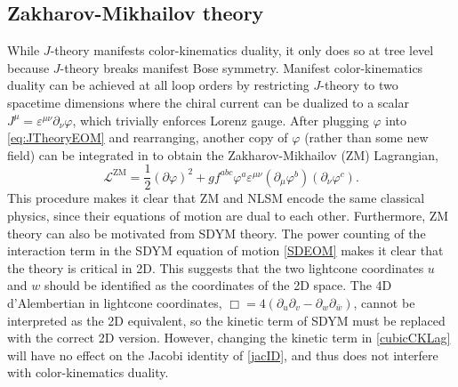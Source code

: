\documentclass[11pt,letter]{article}
\begin{document}
\subsection{Zakharov-Mikhailov theory}
\label{sec:ZMTheory}
While $J$-theory manifests color-kinematics duality, it only does so at
tree level because $J$-theory breaks manifest Bose symmetry.  Manifest
color-kinematics duality can be achieved at all loop orders by
restricting $J$-theory to two spacetime dimensions where the chiral
current can be dualized to a scalar
$J^\mu = \varepsilon^{\mu\nu} \partial_\nu \varphi$, which trivially
enforces Lorenz gauge.  After plugging $\varphi$ into
\cref{eq:JTheoryEOM} and rearranging, another copy of $\varphi$
(rather than some new field) can be integrated in to obtain the
Zakharov-Mikhailov (ZM) Lagrangian,
\begin{equation}
\label{eq:ZMLagrangian}
\mathcal{L}^{\text{ZM}} = \frac{1}{2}(\partial \varphi)^2 + g f^{abc} \varphi^a \varepsilon^{\mu\nu}(\partial_\mu \varphi^b)( \partial_\nu \varphi^c) .
\end{equation}
This procedure makes it clear that ZM and NLSM encode the same
classical physics, since their equations of motion are dual to each
other.  Furthermore, ZM theory can also be motivated from SDYM theory.
The power counting of the interaction term in the SDYM equation of
motion \cref{SDEOM} makes it clear that the theory is critical in 2D.
This suggests that the two lightcone coordinates $u$ and $w$ should be
identified as the coordinates of the 2D space.  The 4D d'Alembertian
in lightcone coordinates,
$\Box = 4 (\partial_u \partial_v - \partial_w \partial_{\bar{w}})$,
cannot be interpreted as the 2D equivalent, so the kinetic term of
SDYM must be replaced with the correct 2D version. However, changing the kinetic term in \cref{cubicCKLag} will have no effect on the Jacobi identity of \cref{jacID}, and thus does not interfere with color-kinematics duality. 
\end{document}
